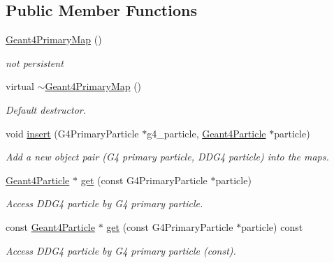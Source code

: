 \subsection*{Public Member Functions}
\begin{DoxyCompactItemize}
\item 
\hyperlink{class_d_d4hep_1_1_simulation_1_1_geant4_primary_map_af51091630c9dbeb00db33d3871af05e4}{Geant4PrimaryMap} ()
\begin{DoxyCompactList}\small\item\em not persistent \item\end{DoxyCompactList}\item 
virtual \hyperlink{class_d_d4hep_1_1_simulation_1_1_geant4_primary_map_a7e013501b60e0d0516648405dcf7affd}{$\sim$Geant4PrimaryMap} ()
\begin{DoxyCompactList}\small\item\em Default destructor. \item\end{DoxyCompactList}\item 
void \hyperlink{class_d_d4hep_1_1_simulation_1_1_geant4_primary_map_affe8f0277373092a08624108d677e7f2}{insert} (G4PrimaryParticle $\ast$g4\_\-particle, \hyperlink{class_d_d4hep_1_1_simulation_1_1_geant4_particle}{Geant4Particle} $\ast$particle)
\begin{DoxyCompactList}\small\item\em Add a new object pair (G4 primary particle, DDG4 particle) into the maps. \item\end{DoxyCompactList}\item 
\hyperlink{class_d_d4hep_1_1_simulation_1_1_geant4_particle}{Geant4Particle} $\ast$ \hyperlink{class_d_d4hep_1_1_simulation_1_1_geant4_primary_map_a4b4f4c2acc5258bdf1cc2b1c9aa735d9}{get} (const G4PrimaryParticle $\ast$particle)
\begin{DoxyCompactList}\small\item\em Access DDG4 particle by G4 primary particle. \item\end{DoxyCompactList}\item 
const \hyperlink{class_d_d4hep_1_1_simulation_1_1_geant4_particle}{Geant4Particle} $\ast$ \hyperlink{class_d_d4hep_1_1_simulation_1_1_geant4_primary_map_ae787c8c255966394d5c222fdee02e0c7}{get} (const G4PrimaryParticle $\ast$particle) const 
\begin{DoxyCompactList}\small\item\em Access DDG4 particle by G4 primary particle (const). \item\end{DoxyCompactList}\item 

\end{DoxyCompactItemize}
